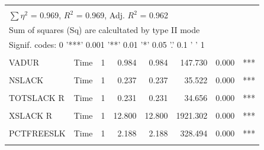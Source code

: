 \documentclass[preprint,
3p]{elsarticle} %
\begin{document}
\begin{longtable}[t]{llrrrrrl}
\endfoot
\bottomrule
\multicolumn{8}{l}{\rule{0pt}{1em}\textit{Note: }}\\
\multicolumn{8}{l}{\rule{0pt}{1em}$\sum \eta^2$ = 0.969, $R^2$ = 0.969, Adj. $R^2$ = 0.962}\\
\multicolumn{8}{l}{\rule{0pt}{1em}Sum of squares (Sq) are calcultated by type II mode}\\
\multicolumn{8}{l}{\rule{0pt}{1em}Signif. codes:  0 '***' 0.001 '**' 0.01 '*' 0.05 '.' 0.1 ' ' 1}\\
\endlastfoot
\cellcolor{gray!10}{XDUR} & \cellcolor{gray!10}{Time} & \cellcolor{gray!10}{1} & \cellcolor{gray!10}{12.385} & \cellcolor{gray!10}{12.385} & \cellcolor{gray!10}{1859.092} & \cellcolor{gray!10}{0.000} & \cellcolor{gray!10}{***}\\
VADUR & Time & 1 & 0.984 & 0.984 & 147.730 & 0.000 & ***\\
\cellcolor{gray!10}{MAXCPL} & \cellcolor{gray!10}{Time} & \cellcolor{gray!10}{1} & \cellcolor{gray!10}{4.143} & \cellcolor{gray!10}{4.143} & \cellcolor{gray!10}{621.854} & \cellcolor{gray!10}{0.000} & \cellcolor{gray!10}{***}\\
NSLACK & Time & 1 & 0.237 & 0.237 & 35.522 & 0.000 & ***\\
\cellcolor{gray!10}{PCTSLACK} & \cellcolor{gray!10}{Time} & \cellcolor{gray!10}{1} & \cellcolor{gray!10}{0.020} & \cellcolor{gray!10}{0.020} & \cellcolor{gray!10}{3.010} & \cellcolor{gray!10}{0.084} & \cellcolor{gray!10}{.}\\
\addlinespace
TOTSLACK R & Time & 1 & 0.231 & 0.231 & 34.656 & 0.000 & ***\\
\cellcolor{gray!10}{XSLACK} & \cellcolor{gray!10}{Time} & \cellcolor{gray!10}{1} & \cellcolor{gray!10}{10.460} & \cellcolor{gray!10}{10.460} & \cellcolor{gray!10}{1570.110} & \cellcolor{gray!10}{0.000} & \cellcolor{gray!10}{***}\\
XSLACK R & Time & 1 & 12.800 & 12.800 & 1921.302 & 0.000 & ***\\
\cellcolor{gray!10}{NFREESLK} & \cellcolor{gray!10}{Time} & \cellcolor{gray!10}{1} & \cellcolor{gray!10}{1.254} & \cellcolor{gray!10}{1.254} & \cellcolor{gray!10}{188.300} & \cellcolor{gray!10}{0.000} & \cellcolor{gray!10}{***}\\
PCTFREESLK & Time & 1 & 2.188 & 2.188 & 328.494 & 0.000 & ***\\
\addlinespace
\cellcolor{gray!10}{XFREESLK} & \cellcolor{gray!10}{Time} & \cellcolor{gray!10}{1} & \cellcolor{gray!10}{0.151} & \cellcolor{gray!10}{0.151} & \cellcolor{gray!10}{22.727} & \cellcolor{gray!10}{0.000} & \cellcolor{gray!10}{***}\\

\end{longtable}
\end{document}
